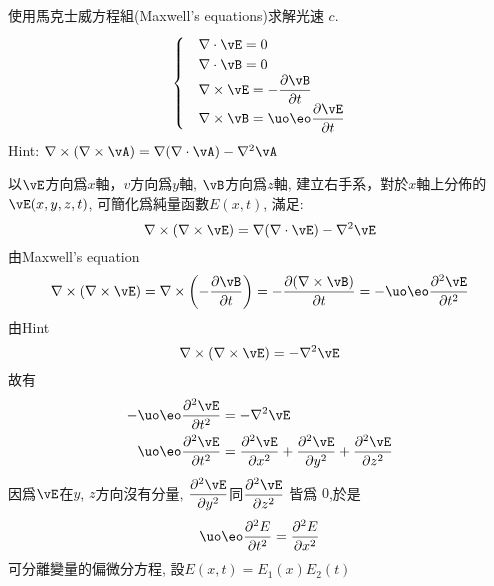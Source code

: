 \begin{diffcult}
    使用馬克士威方程組(Maxwell's equations)求解光速 $c$.
    $$
        \begin{cases}
             & \nabla \cdot \vE = 0                                       \\
             & \nabla \cdot \vB = 0                                       \\
             & \nabla \times \vE = -\dfrac{\partial\vB}{\partial t}       \\
             & \nabla \times \vB = \uo\eo\dfrac{\partial \vE}{\partial t}
        \end{cases}
    $$
    Hint: $\nabla \times (\nabla \times \vA) = \nabla(\nabla \cdot \vA) - \nabla^2\vA$
\end{diffcult}

\begin{solve}
    以$\vE$方向爲$x$軸，$v$方向爲$y$軸, $\vB$方向爲$z$軸, 建立右手系，對於$x$軸上分佈的$\vE(x, y, z, t)$, 可簡化爲純量函數$E(x,t)$, 滿足:
    $$\nabla \times (\nabla \times \vE) = \nabla(\nabla \cdot \vE) - \nabla^2\vE$$
    由Maxwell's equation
    $$\nabla \times (\nabla \times \vE) = \nabla \times \left(-\dfrac{\partial \vB}{\partial t}\right) = -\dfrac{\partial(\nabla \times \vB)}{\partial t} = -\uo\eo\dfrac{\partial^2 \vE}{\partial t^2}$$
    由Hint
    $$\nabla \times (\nabla \times \vE) = -\nabla^2\vE$$
    故有
    \begin{align*}
        -\uo\eo\dfrac{\partial^2 \vE}{\partial t^2} & = -\nabla^2\vE                                                                                                    \\
        \uo\eo\dfrac{\partial^2 \vE}{\partial t^2}  & = \dfrac{\partial^2\vE}{\partial x^2} + \dfrac{\partial^2\vE}{\partial y^2} + \dfrac{\partial^2\vE}{\partial z^2}
    \end{align*}
    因爲$\vE$在$y$, $z$方向沒有分量, $\dfrac{\partial^2\vE}{\partial y^2}$同$\dfrac{\partial^2\vE}{\partial z^2}$ 皆爲 $0$,於是
    $$
        \uo\eo\dfrac{\partial^2 E}{\partial t^2} = \dfrac{\partial^2 E}{\partial x^2}
    $$
    可分離變量的偏微分方程, 設$E(x, t) = E_1(x)E_2(t)$


\end{solve}